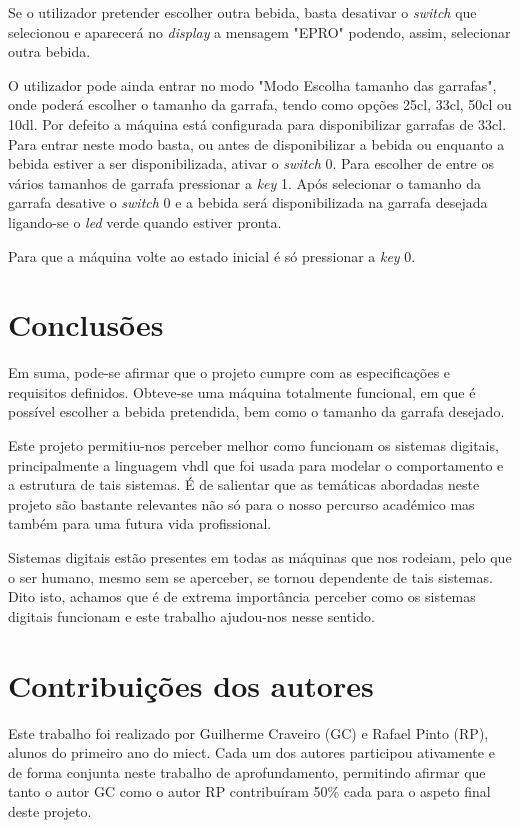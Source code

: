 \documentclass{report}
\begin{document}
Se o utilizador pretender escolher outra bebida, basta desativar o \textit{switch} que selecionou e aparecerá no \textit{display} a mensagem "EPRO" podendo, assim, selecionar outra bebida.

O utilizador pode ainda entrar no modo "Modo Escolha tamanho das garrafas", onde poderá escolher o tamanho da garrafa, tendo como opções 25cl, 33cl, 50cl ou 10dl. Por defeito a máquina está configurada para disponibilizar garrafas de 33cl. Para entrar neste modo basta, ou antes de disponibilizar a bebida ou enquanto a bebida estiver a ser disponibilizada, ativar o \textit{switch} 0. Para escolher de entre os vários tamanhos de garrafa pressionar a \textit{key} 1. Após selecionar o tamanho da garrafa desative o \textit{switch} 0 e a bebida será disponibilizada na garrafa desejada ligando-se o \textit{led} verde quando estiver pronta. 

Para que a máquina volte ao estado inicial é só pressionar a \textit{key} 0.

\chapter{Conclusões}
\label{chap.conclusao}
Em suma, pode-se afirmar que o projeto cumpre com as especificações e requisitos definidos. Obteve-se uma máquina totalmente funcional, em que é possível escolher a bebida pretendida, bem como o tamanho da garrafa desejado. 

Este projeto permitiu-nos perceber melhor como funcionam os sistemas digitais, principalmente a linguagem \ac{vhdl} que foi usada para modelar o comportamento e a estrutura de tais sistemas. É de salientar que as temáticas abordadas neste projeto são bastante relevantes não só para o nosso percurso académico mas também para uma futura vida profissional.

Sistemas digitais estão presentes em todas as máquinas que nos rodeiam, pelo que o ser humano, mesmo sem se aperceber, se tornou dependente de tais sistemas. Dito isto, achamos que é de extrema importância perceber como os sistemas digitais funcionam e este trabalho ajudou-nos nesse sentido.

\chapter*{Contribuições dos autores}
Este trabalho foi realizado por Guilherme Craveiro (GC) e Rafael Pinto (RP), alunos do primeiro ano do \ac{miect}. Cada um dos autores participou ativamente e de forma conjunta neste trabalho de aprofundamento, permitindo afirmar que tanto o autor GC como o autor RP contribuíram 50\% cada para o aspeto final deste projeto. 
\end{document}

